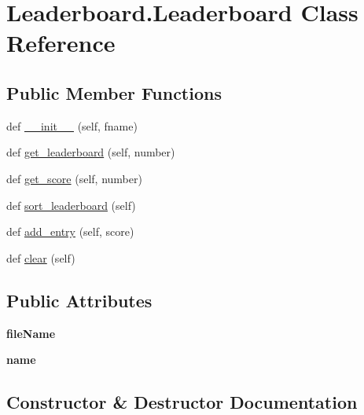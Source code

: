 \hypertarget{class_leaderboard_1_1_leaderboard}{}\section{Leaderboard.\+Leaderboard Class Reference}
\label{class_leaderboard_1_1_leaderboard}
\subsection*{Public Member Functions}
\begin{DoxyCompactItemize}
\item 
def \hyperlink{class_leaderboard_1_1_leaderboard_affaf4d66aef087946bdd8807bf7f5179}{\+\_\+\+\_\+init\+\_\+\+\_\+} (self, fname)
\item 
def \hyperlink{class_leaderboard_1_1_leaderboard_a3e17718a0ee4803bce571e3577fa75de}{get\+\_\+leaderboard} (self, number)
\item 
def \hyperlink{class_leaderboard_1_1_leaderboard_aa1a10cb11235dc6ba207e0cff6586906}{get\+\_\+score} (self, number)
\item 
def \hyperlink{class_leaderboard_1_1_leaderboard_a5d275657e02abc778198a8c4aa6f4304}{sort\+\_\+leaderboard} (self)
\item 
def \hyperlink{class_leaderboard_1_1_leaderboard_a5843c7b6939076a386b2636f85e6596c}{add\+\_\+entry} (self, score)
\item 
def \hyperlink{class_leaderboard_1_1_leaderboard_a0e63ac70057d6e900598b04492b3634c}{clear} (self)
\end{DoxyCompactItemize}
\subsection*{Public Attributes}
\begin{DoxyCompactItemize}
\item 
\mbox{\label{class_leaderboard_1_1_leaderboard_afe984283cfd21ebd9aac63a6a66c2f94}} 
{\bfseries file\+Name}
\item 
\mbox{\label{class_leaderboard_1_1_leaderboard_af4f737f3c0e647c287ecbcf88722d908}} 
{\bfseries name}
\end{DoxyCompactItemize}


\subsection{Constructor \& Destructor Documentation}
\mbox{\label{class_leaderboard_1_1_leaderboard_affaf4d66aef087946bdd8807bf7f5179}} 
